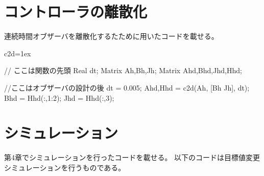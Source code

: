 \section{コントローラの離散化}
	連続時間オブザーバを離散化するたために用いたコードを載せる。
	\begin{breakitembox}[l]{c2d}\baselineskip=1ex
		\begin{verbatimtab}[4]
		
// ここは関数の先頭
Real dt;
Matrix Ah,Bh,Jh;
Matrix Ahd,Bhd,Jhd,Hhd;

//ここはオブザーバの設計の後
dt = 0.005;
{Ahd,Hhd} = c2d(Ah, [Bh Jh], dt);
Bhd = Hhd(:,1:2);
Jhd = Hhd(:,3);
		\end{verbatimtab}
	\end{breakitembox}
\section{シミュレーション}
	第4章でシミュレーションを行ったコードを載せる。
	以下のコードは目標値変更シミュレーションを行うものである。
